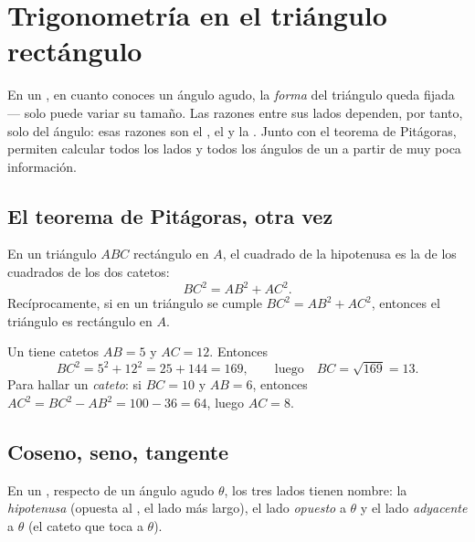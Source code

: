 \chapter{Trigonometría en el triángulo rectángulo}\label{ch:g9:trig}

En un , en cuanto conoces un ángulo agudo, la \emph{forma}
del triángulo queda fijada --- solo puede variar su tamaño. Las razones entre sus lados
dependen, por tanto, solo del ángulo: esas razones son el , el  y la
. Junto con el teorema de Pitágoras, permiten calcular
todos los lados y todos los ángulos de un  a partir de muy poca
información.

\section{El teorema de Pitágoras, otra vez}

\begin{theorem}[Pitágoras]\label{thm:g9:trig:pythagoras}
En un triángulo $ABC$ rectángulo en $A$, el cuadrado de la hipotenusa es la
 de los cuadrados de los dos catetos:
\[
BC^2 = AB^2 + AC^2 .
\]
Recíprocamente, si en un triángulo se cumple $BC^2 = AB^2 + AC^2$, entonces el triángulo es
rectángulo en $A$.
\end{theorem}
\admitted

\begin{example}\label{ex:g9:trig:pythagoras}
Un  tiene catetos $AB = 5$ y $AC = 12$. Entonces
\[
BC^2 = 5^2 + 12^2 = 25 + 144 = 169,
\qquad\text{luego}\quad BC = \sqrt{169} = 13 .
\]
Para hallar un \emph{cateto}: si $BC = 10$ y $AB = 6$, entonces
$AC^2 = BC^2 - AB^2 = 100 - 36 = 64$, luego $AC = 8$.
\end{example}

\section{Coseno, seno, tangente}

En un , respecto de un ángulo agudo $\theta$, los tres lados
tienen nombre: la \emph{hipotenusa} (opuesta al , el lado más
largo), el lado \emph{opuesto} a $\theta$ y el lado
\emph{adyacente} a $\theta$ (el cateto que toca a $\theta$).

